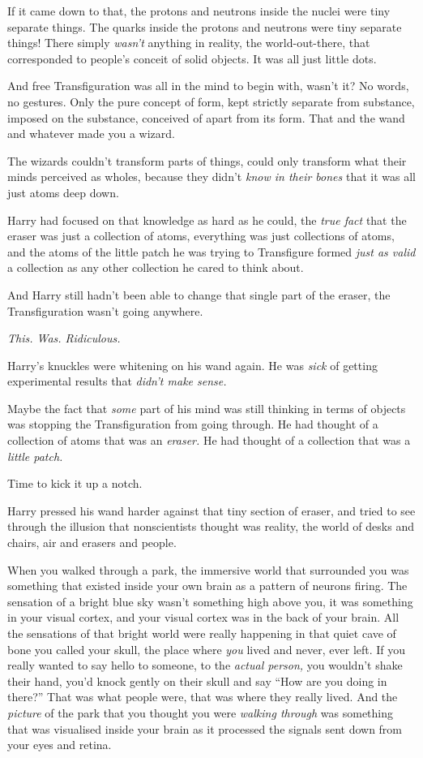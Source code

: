 If it came down to that, the protons and neutrons inside the nuclei were
tiny separate things. The quarks inside the protons and neutrons were
tiny separate things! There simply \emph{wasn't} anything in reality,
the world-out-there, that corresponded to people's conceit of solid
objects. It was all just little dots.

And free Transfiguration was all in the mind to begin with, wasn't it?
No words, no gestures. Only the pure concept of form, kept strictly
separate from substance, imposed on the substance, conceived of apart
from its form. That and the wand and whatever made you a wizard.

The wizards couldn't transform parts of things, could only transform
what their minds perceived as wholes, because they didn't \emph{know in
their bones} that it was all just atoms deep down.

Harry had focused on that knowledge as hard as he could, the \emph{true
fact} that the eraser was just a collection of atoms, everything was
just collections of atoms, and the atoms of the little patch he was
trying to Transfigure formed \emph{just as valid} a collection as any
other collection he cared to think about.

And Harry still hadn't been able to change that single part of the
eraser, the Transfiguration wasn't going anywhere.

\emph{This. Was. Ridiculous.}

Harry's knuckles were whitening on his wand again. He was \emph{sick} of
getting experimental results that \emph{didn't make sense.}

Maybe the fact that \emph{some} part of his mind was still thinking in
terms of objects was stopping the Transfiguration from going through. He
had thought of a collection of atoms that was an \emph{eraser.} He had
thought of a collection that was a \emph{little patch.}

Time to kick it up a notch.

Harry pressed his wand harder against that tiny section of eraser, and
tried to see through the illusion that nonscientists thought was
reality, the world of desks and chairs, air and erasers and people.

When you walked through a park, the immersive world that surrounded you
was something that existed inside your own brain as a pattern of neurons
firing. The sensation of a bright blue sky wasn't something high above
you, it was something in your visual cortex, and your visual cortex was
in the back of your brain. All the sensations of that bright world were
really happening in that quiet cave of bone you called your skull, the
place where \emph{you} lived and never, ever left. If you really wanted
to say hello to someone, to the \emph{actual person,} you wouldn't shake
their hand, you'd knock gently on their skull and say ``How are you
doing in there?'' That was what people were, that was where they really
lived. And the \emph{picture} of the park that you thought you were
\emph{walking through} was something that was visualised inside your
brain as it processed the signals sent down from your eyes and retina.

